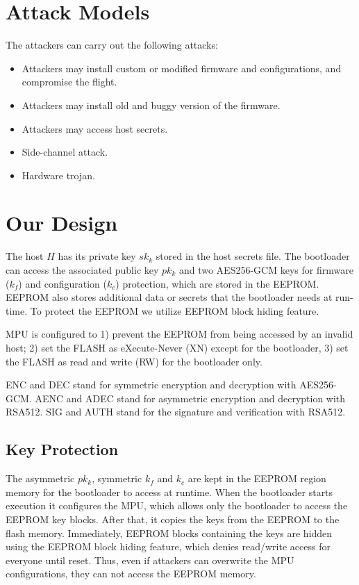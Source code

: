 \documentclass[11pt,oneside,onecolumn,letterpaper]{article}
\begin{document}
\section{Attack Models}

The attackers can carry out the following attacks:

\begin{itemize}
  \item Attackers may install custom or modified firmware and configurations, and compromise the flight.
  \item Attackers may install old and buggy version of the firmware.
  \item Attackers may access host secrets.
  \item Side-channel attack.
  \item Hardware trojan.
\end{itemize}


\section{Our Design}

The host $H$ has its private key $sk_k$ stored in the host secrets file.
The bootloader can access the associated public key $pk_k$ and two AES256-GCM keys for firmware ($k_f$) and configuration ($k_c$) protection, which are stored in the EEPROM.
EEPROM also stores additional data or secrets that the bootloader needs at run-time.
To protect the EEPROM we utilize EEPROM block hiding feature.

MPU is configured to 1) prevent the EEPROM from being accessed by an invalid host; 2) set the FLASH as eXecute-Never (XN) except for the bootloader, 3) set the FLASH as read and write (RW) for the bootloader only. 

ENC and DEC stand for symmetric encryption and decryption with AES256-GCM.
AENC and ADEC stand for asymmetric encryption and decryption with RSA512.
SIG and AUTH stand for the signature and verification with RSA512.

\subsection{Key Protection}
The asymmetric $pk_k$, symmetric $k_f$ and $k_c$ are kept in the EEPROM region memory for the bootloader to access at runtime.
When the bootloader starts execution it configures the MPU, which allows only the bootloader to access the EEPROM key blocks.
After that, it copies the keys from the EEPROM to the flash memory.
Immediately, EEPROM blocks containing the keys are hidden using the EEPROM block hiding feature, which denies read/write access for everyone until reset.
Thus, even if attackers can overwrite the MPU configurations, they can not access the EEPROM memory.
\end{document}
